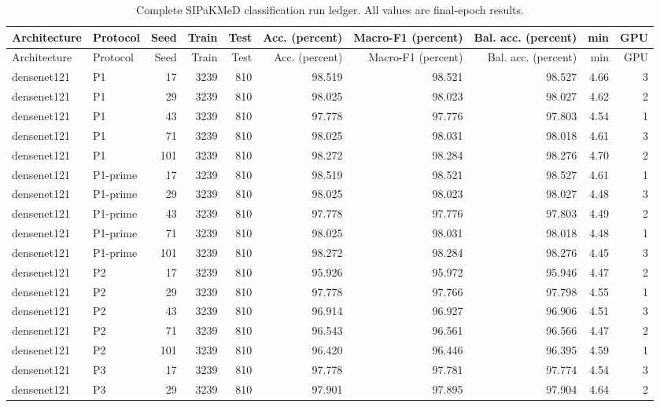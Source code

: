 \begin{longtable}{p{2.25cm}p{1.1cm}rrrrrrrr}
\caption{Complete SIPaKMeD classification run ledger. All values are final-epoch results.}\label{tab:all-class-runs}\\
\toprule
Architecture & Protocol & Seed & Train & Test & Acc. (percent) & Macro-F1 (percent) & Bal. acc. (percent) & min & GPU \\
\midrule
\endfirsthead
\toprule
Architecture & Protocol & Seed & Train & Test & Acc. (percent) & Macro-F1 (percent) & Bal. acc. (percent) & min & GPU \\
\midrule
\endhead
\bottomrule
\endfoot
densenet121 & P1 & 17 & 3239 & 810 & 98.519 & 98.521 & 98.527 & 4.66 & 3 \\ 
densenet121 & P1 & 29 & 3239 & 810 & 98.025 & 98.023 & 98.027 & 4.62 & 2 \\ 
densenet121 & P1 & 43 & 3239 & 810 & 97.778 & 97.776 & 97.803 & 4.54 & 1 \\ 
densenet121 & P1 & 71 & 3239 & 810 & 98.025 & 98.031 & 98.018 & 4.61 & 3 \\ 
densenet121 & P1 & 101 & 3239 & 810 & 98.272 & 98.284 & 98.276 & 4.70 & 2 \\ 
densenet121 & P1-prime & 17 & 3239 & 810 & 98.519 & 98.521 & 98.527 & 4.61 & 1 \\ 
densenet121 & P1-prime & 29 & 3239 & 810 & 98.025 & 98.023 & 98.027 & 4.48 & 3 \\ 
densenet121 & P1-prime & 43 & 3239 & 810 & 97.778 & 97.776 & 97.803 & 4.49 & 2 \\ 
densenet121 & P1-prime & 71 & 3239 & 810 & 98.025 & 98.031 & 98.018 & 4.48 & 1 \\ 
densenet121 & P1-prime & 101 & 3239 & 810 & 98.272 & 98.284 & 98.276 & 4.45 & 3 \\ 
densenet121 & P2 & 17 & 3239 & 810 & 95.926 & 95.972 & 95.946 & 4.47 & 2 \\ 
densenet121 & P2 & 29 & 3239 & 810 & 97.778 & 97.766 & 97.798 & 4.55 & 1 \\ 
densenet121 & P2 & 43 & 3239 & 810 & 96.914 & 96.927 & 96.906 & 4.51 & 3 \\ 
densenet121 & P2 & 71 & 3239 & 810 & 96.543 & 96.561 & 96.566 & 4.47 & 2 \\ 
densenet121 & P2 & 101 & 3239 & 810 & 96.420 & 96.446 & 96.395 & 4.59 & 1 \\ 
densenet121 & P3 & 17 & 3239 & 810 & 97.778 & 97.781 & 97.774 & 4.54 & 3 \\ 
densenet121 & P3 & 29 & 3239 & 810 & 97.901 & 97.895 & 97.904 & 4.64 & 2 \\ 

\end{longtable}
